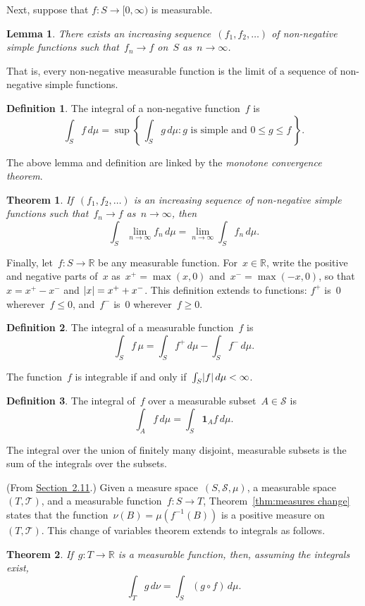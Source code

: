 \documentclass[11pt,a4paper]{article}
\newcommand\mb[1]{\mathbb{#1}}                   %
\newcommand\mc[1]{\mathcal{#1}}                  %
\DeclarePairedDelimiter\abs{\lvert}{\rvert}      %
\newtheorem{lem}{Lemma}
\newtheorem{thm}{Theorem}
\theoremstyle{definition}
\newtheorem{defn}{Definition}
\begin{document}
Next, suppose that $f\colon S \to [0,\infty)$ is measurable.
\begin{lem}
There exists an increasing sequence~$(f_1,f_2,\dots)$ of non-negative simple
functions such that~$f_n \to f$ on~$S$ as~$n \to \infty$.
\end{lem}
That is, every non-negative measurable function is the limit of a sequence of
non-negative simple functions.

\begin{defn}
The integral of a non-negative function~$f$ is
\[ \int_S f\,d\mu = \sup\left\{\, \int_S g\,d\mu
  : g \text{ is simple and } 0 \le g \le f \,\right\}. \]
\end{defn}

The above lemma and definition are linked by the \emph{monotone convergence
theorem}.
\begin{thm}
If~$(f_1,f_2,\dots)$ is an increasing sequence of non-negative simple functions
such that~$f_n \to f$ as~$n \to \infty$, then
\[ \int_S \lim_{n\to\infty} f_n\,d\mu = \lim_{n\to\infty} \int_S f_n\,d\mu. \]
\end{thm}

Finally, let~$f\colon S \to \mb{R}$ be any measurable function. For~$x \in
\mb{R}$, write the positive and negative parts of~$x$ as~$x^+ = \max(x,0)$
and~$x^- = \max(-x,0)$, so that $x = x^+ - x^-$ and $\abs{x} = x^+ + x^-$. This
definition extends to functions: $f^+$ is~$0$ wherever~$f \le 0$, and~$f^-$
is~$0$ wherever~$f \ge 0$.
\begin{defn}
The integral of a measurable function~$f$ is
\[ \int_S f\,\mu = \int_S f^+\,d\mu - \int_S f^-\,d\mu. \]
\end{defn}
The function~$f$ is integrable if and only if~$\int_S \abs{f}\,d\mu < \infty$.

\begin{defn}
The integral of~$f$ over a measurable subset~$A \in \mc{S}$ is
\[ \int_A f\,d\mu = \int_S \symbf{1}_A f\,d\mu. \]
\end{defn}
The integral over the union of finitely many disjoint, measurable subsets is the
sum of the integrals over the subsets.

(From \href{http://www.randomservices.org/random/dist/Properties.html}
{Section~2.11}.) Given a measure space~$(S,\mc{S},\mu)$, a measurable
space~$(T,\mc{T})$, and a measurable function~$f\colon S \to T$,
Theorem~\ref{thm:measures change} states that the function~$\nu(B) =
\mu(f^{-1}(B))$ is a positive measure on~$(T,\mc{T})$. This change of variables
theorem extends to integrals as follows.
\begin{thm}
If~$g\colon T \to \mb{R}$ is a measurable function, then, assuming the
integrals exist,
\[ \int_T g\,d\nu = \int_S (g \circ f)\,d\mu. \]
\end{thm}
\end{document}
